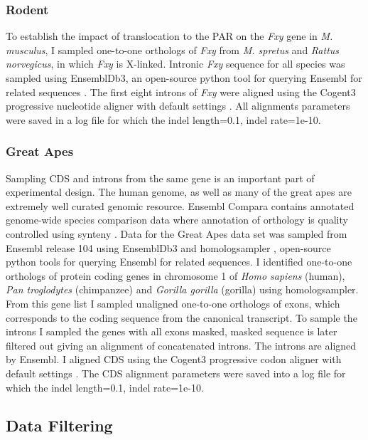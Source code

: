 \subsubsection{Rodent}

To establish the impact of translocation to the PAR on the \textit{Fxy} gene in \textit{M. musculus}, I sampled one-to-one orthologs of \textit{Fxy} from \textit{M. spretus} and \textit{Rattus norvegicus}, in which \textit{Fxy} is X-linked. Intronic \textit{Fxy} sequence for all species was sampled using EnsemblDb3, an open-source python tool for querying Ensembl for related sequences \citep{HuttleyEnsembldb3}. The first eight introns of \textit{Fxy} were  aligned using the Cogent3 progressive nucleotide aligner with default settings \citep{Knight2007PyCogent:Sequence}. All alignments parameters were saved in a log file for which the indel length=0.1, indel rate=1e-10. 

\subsubsection{Great Apes}

Sampling CDS and introns from the same gene is an important part of experimental design. The human genome, as well as many of the great apes are extremely well curated genomic resource. Ensembl Compara contains annotated genome-wide species comparison data where annotation of orthology is quality controlled using synteny \citep{Herrero2016EnsemblResources}. Data for the Great Apes data set was sampled from Ensembl release 104 \citep{Howe2021Ensembl2021} using EnsemblDb3 \citep{HuttleyEnsembldb3} and homologsampler \citep{HuttleyHomologsampler}, open-source python tools for querying Ensembl for related sequences. I identified one-to-one orthologs of protein coding genes in chromosome 1 of \textit{Homo sapiens} (human), \textit{Pan troglodytes} (chimpanzee) and \textit{Gorilla gorilla} (gorilla) using homologsampler. From this gene list I sampled unaligned one-to-one orthologs of exons, which corresponds to the coding sequence from the canonical transcript. To sample the introns I sampled the genes with all exons masked, masked sequence is later filtered out giving an alignment of concatenated introns. The introns are aligned by Ensembl. I aligned CDS using the Cogent3 progressive codon aligner with default settings \citep{Knight2007PyCogent:Sequence}. The CDS alignment parameters were saved into a log file for which the indel length=0.1, indel rate=1e-10. 

\subsection{Data Filtering}

